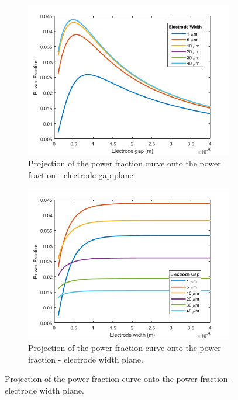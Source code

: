 \begin{figure}[h]
\begin{subfigure}[b]{0.49\textwidth}
    \end{subfigure}
    \\
    \vspace{0.1 in}
    \begin{subfigure}[b]{0.49\textwidth}
        \centering
        \includegraphics[width=\textwidth]{images/expandedPowerVsGap.png}
        \caption{Projection of the power fraction curve onto the power fraction - electrode gap plane.}
    \end{subfigure}
    \hfill
    \begin{subfigure}[b]{0.49\textwidth}
        \centering
        \includegraphics[width=\textwidth]{images/expandedPowerVsWidth.png}
        \caption{Projection of the power fraction curve onto the power fraction - electrode width plane.}

\end{subfigure}
\end{figure}
